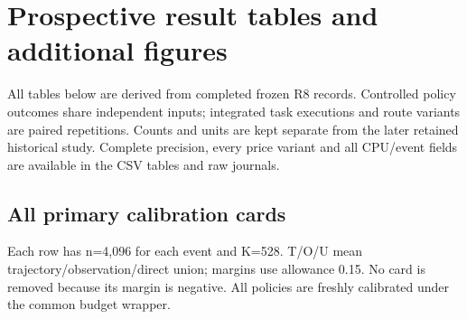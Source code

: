 \section{Prospective result tables and additional figures}\label{supp:r8-results}
All tables below are derived from completed frozen R8 records. Controlled policy outcomes share independent inputs; integrated task executions and route variants are paired repetitions. Counts and units are kept separate from the later retained historical study. Complete precision, every price variant and all CPU/event fields are available in the CSV tables and raw journals.
\subsection{All primary calibration cards}
Each row has n=4,096 for each event and K=528. T/O/U mean trajectory/observation/direct union; margins use allowance 0.15. No card is removed because its margin is negative. All policies are freshly calibrated under the common budget wrapper.
